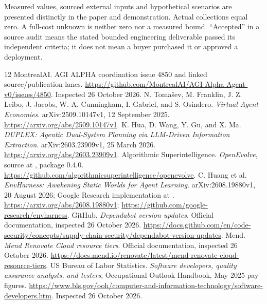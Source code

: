 \documentclass[11pt,a4paper]{article}
\begin{document}
Measured values, sourced external inputs and hypothetical scenarios are presented distinctly in the paper and demonstration. Actual collections equal zero. A full-cost unknown is neither zero nor a measured bound. ``Accepted'' in a source audit means the stated bounded engineering deliverable passed its independent criteria; it does not mean a buyer purchased it or approved a deployment.

\begin{thebibliography}{12}
 MontrealAI. AGI ALPHA coordination issue 4850 and linked source/publication lanes. \url{https://github.com/MontrealAI/AGI-Alpha-Agent-v0/issues/4850}. Inspected 26 October 2026.
 N. Toma\v{s}ev, M. Franklin, J. Z. Leibo, J. Jacobs, W. A. Cunningham, I. Gabriel, and S. Osindero. \emph{Virtual Agent Economies}. arXiv:2509.10147v1, 12 September 2025. \url{https://arxiv.org/abs/2509.10147v1}.
 K. Hua, D. Wang, Y. Gu, and X. Ma. \emph{DUPLEX: Agentic Dual-System Planning via LLM-Driven Information Extraction}. arXiv:2603.23909v1, 25 March 2026. \url{https://arxiv.org/abs/2603.23909v1}.
 Algorithmic Superintelligence. \emph{OpenEvolve}, source at , package 0.4.0. \url{https://github.com/algorithmicsuperintelligence/openevolve}.
 C. Huang et al. \emph{EnvHarness: Awakening Static Worlds for Agent Learning}. arXiv:2608.19880v1, 20 August 2026; Google Research implementation at . \url{https://arxiv.org/abs/2608.19880v1}; \url{https://github.com/google-research/envharness}.
 GitHub. \emph{Dependabot version updates}. Official documentation, inspected 26 October 2026. \url{https://docs.github.com/en/code-security/concepts/supply-chain-security/dependabot-version-updates}.
 Mend. \emph{Mend Renovate Cloud resource tiers}. Official documentation, inspected 26 October 2026. \url{https://docs.mend.io/renovate/latest/mend-renovate-cloud-resource-tiers}.
 US Bureau of Labor Statistics. \emph{Software developers, quality assurance analysts, and testers}, Occupational Outlook Handbook, May 2025 pay figures. \url{https://www.bls.gov/ooh/computer-and-information-technology/software-developers.htm}. Inspected 26 October 2026.
\end{thebibliography}
\end{document}
